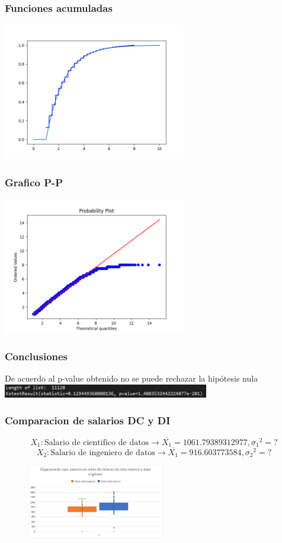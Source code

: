 \documentclass{beamer}
\begin{document}
\begin{frame}
  \frametitle{Funciones acumuladas}
  \includegraphics[width=8cm]{hip2/acumuladas.png}

\end{frame}

\begin{frame}
  \frametitle{Grafico P-P}
  \includegraphics[width=8cm]{hip2/grafico_pp.png}
\end{frame}

\begin{frame}
  \frametitle{Conclusiones}
  De acuerdo al p-value obtenido no se puede rechazar la hipótesis nula
  \includegraphics[width=9cm]{hip2/p-val.jpg}
\end{frame}

\begin{frame}
  \frametitle{Comparacion de salarios DC y DI}
  \[{X_1}: \textrm{Salario de cientifico de datos} \rightarrow \overline{X_1} = 1061.79389312977, {\sigma_1}^2 = ?\]
  \[{X_2}: \textrm{Salario de ingeniero de datos} \rightarrow \overline{X_1} = 916.603773584, {\sigma_2}^2 = ?\]
\begin{figure}[t]
  \includegraphics[width=6cm]{cajas1.jpeg}
\end{figure}
\end{frame}
\end{document}
